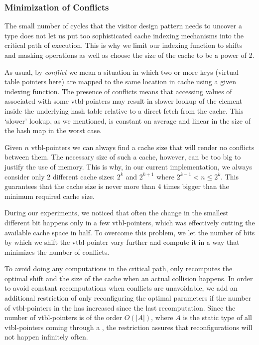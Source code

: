 \subsubsection{Minimization of Conflicts}
\label{sec:moc}

The small number of cycles that the visitor design pattern needs to uncover a 
type does not let us put too sophisticated cache indexing mechanisms into the 
critical path of execution. This is why we limit our indexing function to shifts 
and masking operations as well as choose the size of the cache to be a power of 2.

As usual, by \emph{conflict} we mean a situation in which two or more keys (virtual 
table pointers here) are mapped to the same location in cache using a given indexing 
function. The presence of conflicts means that accessing values of  
associated with some vtbl-pointers may result in slower lookup of the element 
inside the underlying hash table relative to a direct fetch from the cache.
This `slower' lookup, as we mentioned, is constant on average and linear in the 
size of the hash map in the worst case.

Given $n$ vtbl-pointers we can always find a cache size that will render no 
conflicts between them. The necessary size of such a cache, however, can be too 
big to justify the use of memory. This is why, in our current implementation, we 
always consider only 2 different cache sizes: $2^k$ and $2^{k+1}$ where 
$2^{k-1} < n \leq 2^k$. This guarantees that the cache size is never more than 4 
times bigger than the minimum required cache size.

During our experiments, we noticed that often the change in the smallest 
different bit happens only in a few vtbl-pointers, which was effectively 
cutting the available cache space in half. To overcome this problem, we let the 
number of bits by which we shift the vtbl-pointer vary further and compute it in 
a way that minimizes the number of conflicts.

To avoid doing any computations in the critical path,  only 
recomputes the optimal shift and the size of the cache when an actual collision 
happens. In order to avoid constant recomputations when conflicts are unavoidable, 
we add an additional restriction of only reconfiguring the optimal parameters if 
the number of vtbl-pointers in the  has increased since the last 
recomputation. Since the number of vtbl-pointers is of the order $O(|A|)$, where 
$A$ is the static type of all vtbl-pointers coming through a , the 
restriction assures that reconfigurations will not happen infinitely often.

